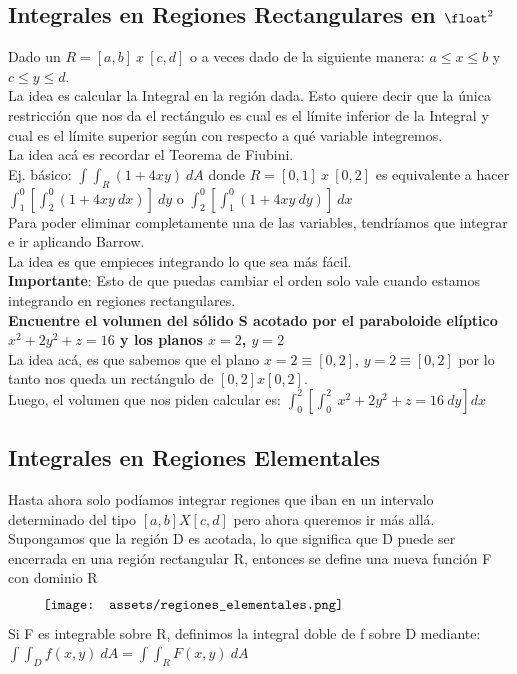 \documentclass[10pt,a4paper]{article}
\begin{document}
\subsection*{Integrales en Regiones Rectangulares en $\float^{2}$}
Dado un $R = [a, b] \ x \ [c, d]$ o a veces dado de la siguiente manera: $a \le x \le b$ y $c \le y \le d$. \\
La idea es calcular la Integral en la región dada. Esto quiere decir que la única restricción que nos da el rectángulo es cual es el límite inferior de la Integral y cual es el límite superior según con respecto a qué variable integremos. \\
La idea acá es recordar el Teorema de Fiubini. \\
Ej. básico: $\int \int_{R}(1+4xy) \ dA$ donde $R = [0,1] \ x \ [0,2]$ es equivalente a hacer $\int^{0}_{1} [\int^{0}_{2}(1+4xy \ dx)] \ dy$ o $\int^{0}_{2} [\int^{0}_{1}(1+4xy \ dy)] \ dx$ \\
Para poder eliminar completamente una de las variables, tendríamos que integrar e ir aplicando Barrow. \\
La idea es que empieces integrando lo que sea más fácil. \\
\textbf{Importante}: Esto de que puedas cambiar el orden solo vale cuando estamos integrando en regiones rectangulares. \\

\textbf{Encuentre el volumen del sólido S acotado por el paraboloide elíptico $x^{2} + 2y^{2}+z=16$ y los planos $x=2$, $y=2$} \\
La idea acá, es que sabemos que el plano $x=2 \equiv [0, 2]$, $y=2 \equiv [0,2]$ por lo tanto nos queda un rectángulo de $[0,2] x [0,2]$. \\
Luego, el volumen que nos piden calcular es: $\int^{2}_{0} [\int^{2}_{0} \ x^{2} + 2y^{2}+z=16 \ dy] dx$
\subsection*{Integrales en Regiones Elementales}
Hasta ahora solo podíamos integrar regiones que iban en un intervalo determinado del tipo $[a,b] X [c, d]$ pero ahora queremos ir más allá. \\ 
Supongamos que la región D es acotada, lo que significa que D puede ser encerrada en una región rectangular R, entonces se define una nueva función F con dominio R 
\[\begin{minipage}[b]{0.9\textwidth}
    \texttt{[image: assets/regiones\_elementales.png]}
\end{minipage}\]
Si F es integrable sobre R, definimos la integral doble de f sobre D mediante: $\int\int_{D} f(x, y) \ dA = \int\int_{R} F(x,y) \ dA$
\end{document}
